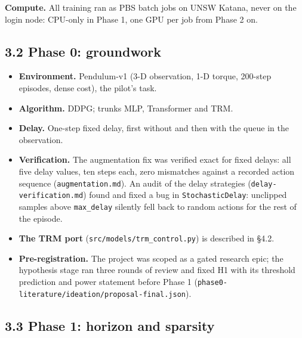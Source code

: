 \documentclass[11pt]{article}
\begin{document}
\textbf{Compute.} All training ran as PBS batch jobs on UNSW Katana, never on the login node: CPU-only in Phase 1, one GPU per job from Phase 2 on.



\subsection*{3.2 Phase 0: groundwork}



\begin{itemize}
\item \textbf{Environment.} Pendulum-v1 (3-D observation, 1-D torque, 200-step episodes, dense cost), the pilot's task.
\item \textbf{Algorithm.} DDPG; trunks MLP, Transformer and TRM.
\item \textbf{Delay.} One-step fixed delay, first without and then with the queue in the observation.
\item \textbf{Verification.} The augmentation fix was verified exact for fixed delays: all five delay values, ten steps each, zero mismatches against a recorded action sequence (\texttt{augmentation.\allowbreak{}md}). An audit of the delay strategies (\texttt{delay-verification.\allowbreak{}md}) found and fixed a bug in \texttt{StochasticDelay}: unclipped samples above \texttt{max\_delay} silently fell back to random actions for the rest of the episode.
\item \textbf{The TRM port} (\texttt{src/\allowbreak{}models/\allowbreak{}trm\_\allowbreak{}control.\allowbreak{}py}) is described in \S{}4.2.
\item \textbf{Pre-registration.} The project was scoped as a gated research epic; the hypothesis stage ran three rounds of review and fixed H1 with its threshold prediction and power statement before Phase 1 (\texttt{phase0-literature/\allowbreak{}ideation/\allowbreak{}proposal-final.\allowbreak{}json}).
\end{itemize}



\subsection*{3.3 Phase 1: horizon and sparsity}
\end{document}
